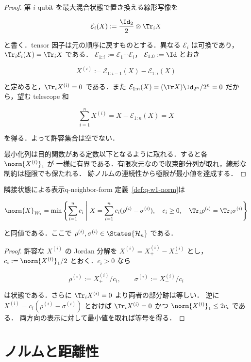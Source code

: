 \begin{proof}
  第 $i$ qubit を最大混合状態で置き換える線形写像を

  \[
    \mathcal{E}_i(X):=\frac{\Id_2}{2}\otimes\Tr_iX
  \]

  と書く．tensor 因子は元の順序に戻すものとする．異なる $\mathcal{E}_i$ は可換であり，
  $\Tr_i\mathcal{E}_i(X)=\Tr_iX$ である．
  $\mathcal{E}_{1:i}:=\mathcal{E}_1\cdots\mathcal{E}_i$，
  $\mathcal{E}_{1:0}:=\Id$ とおき

  \[
    X^{(i)}:=\mathcal{E}_{1:i-1}(X)-\mathcal{E}_{1:i}(X)
  \]

  と定めると，$\Tr_iX^{(i)}=0$ である．また
  $\mathcal{E}_{1:n}(X)=(\Tr X)\Id_{2^n}/2^n=0$ だから，望む telescope 和

  \[
    \sum_{i=1}^nX^{(i)}=X-\mathcal{E}_{1:n}(X)=X
  \]

  を得る．よって許容集合は空でない．

  最小化列は目的関数がある定数以下となるように取れる．すると各 $\norm{X^{(i)}}_1$ が
  一様に有界である．有限次元なので収束部分列が取れ，線形な制約は極限でも保たれる．
  跡ノルムの連続性から極限が最小値を達成する．
\end{proof}

\begin{proposition}{隣接状態による表示}{q-neighbor-form}
  定義~\ref{def:q-w1-norm}は

  \[
    \norm{X}_{W_1}
    =\min\left\{
      \sum_{i=1}^nc_i
      \;\middle|\;
      X=\sum_{i=1}^nc_i(\rho^{(i)}-\sigma^{(i)}),\quad
      c_i\geq0,\quad
      \Tr_i\rho^{(i)}=\Tr_i\sigma^{(i)}
    \right\}
  \]

  と同値である．ここで $\rho^{(i)},\sigma^{(i)}\in\States{\mathcal{H}_n}$ である．
\end{proposition}

\begin{proof}
  許容な $X^{(i)}$ の Jordan 分解を
  $X^{(i)}=X^{(i)}_+-X^{(i)}_-$ とし，
  $c_i:=\norm{X^{(i)}}_1/2$ とおく．$c_i>0$ なら

  \[
    \rho^{(i)}:=X^{(i)}_+/c_i,
    \qquad
    \sigma^{(i)}:=X^{(i)}_-/c_i
  \]

  は状態である．さらに $\Tr_iX^{(i)}=0$ より両者の部分跡は等しい．
  逆に $X^{(i)}=c_i(\rho^{(i)}-\sigma^{(i)})$ とおけば
  $\Tr_iX^{(i)}=0$ かつ $\norm{X^{(i)}}_1\leq2c_i$ である．
  両方向の表示に対して最小値を取れば等号を得る．
\end{proof}

\section{ノルムと距離性}

